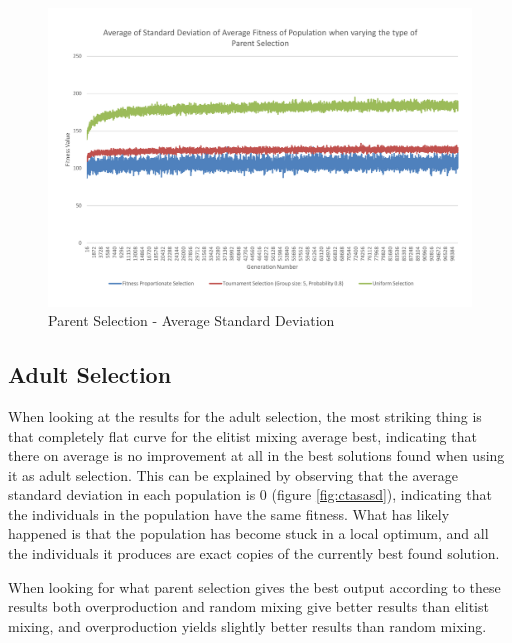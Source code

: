 \begin{figure}[thbp]
	\centerline{\includegraphics[width=\paperwidth]{figures/CircleTests/CircleTestParentSelectionAverageStandardDeviation.pdf}}
	\caption{Parent Selection - Average Standard Deviation}
\end{figure}

\clearpage

\subsection{Adult Selection} %
\label{sub:adult_selection}

When looking at the results for the adult selection, the most striking thing is that completely flat curve for the elitist mixing average best, indicating that there on average is no improvement at all in the best solutions found when using it as adult selection. This can be explained by observing that the average standard deviation in each population is 0 (figure \ref{fig:ctasasd}), indicating that the individuals in the population have the same fitness. What has likely happened is that the population has become stuck in a local optimum, and all the individuals it produces are exact copies of the currently best found solution.

When looking for what parent selection gives the best output according to these results both overproduction and random mixing give better results than elitist mixing, and overproduction yields slightly better results than random mixing.

